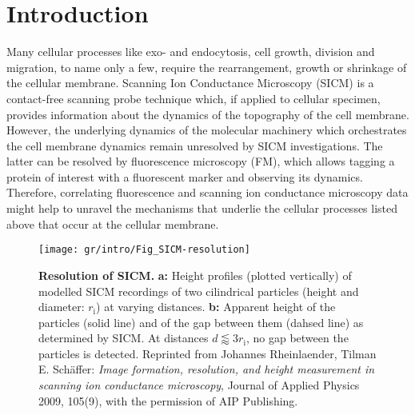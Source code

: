 \section{Introduction}
\label{sec:introduction}
Many cellular processes like exo- and endocytosis, cell growth, division and
migration, to name only a few, require the rearrangement, growth or shrinkage
of the cellular membrane. Scanning Ion Conductance Microscopy (SICM)
\cite{Hansma1989} is a contact-free scanning probe technique which, if applied
to cellular specimen, provides information about the dynamics of the
topography of the cell membrane. However, the underlying dynamics of the
molecular machinery which orchestrates the cell membrane dynamics remain
unresolved by SICM investigations. The latter can be resolved by fluorescence
microscopy (FM), which allows tagging a protein of interest with a fluorescent
marker and observing its dynamics. Therefore, correlating fluorescence and
scanning ion conductance microscopy data might help to unravel the mechanisms
that underlie the cellular processes listed above that occur at the cellular
membrane.

\begin{figure}\centering
  \texttt{[image: gr/intro/Fig\_SICM-resolution]}
  \caption{\textbf{Resolution of SICM.}  \textbf{a:} Height profiles
    (plotted vertically) of modelled SICM recordings of two cilindrical
    particles (height and diameter: $r_\text{i}$) at varying
    distances. \textbf{b:} Apparent height of the particles (solid line) and of
    the gap between them (dahsed line) as determined by SICM. At distances
    $d\lessapprox3r_\text{i}$, no gap between the particles is detected.
    Reprinted from Johannes Rheinlaender, Tilman E. Schäffer: \emph{Image
      formation, resolution, and height measurement in scanning ion
      conductance microscopy}, Journal of Applied Physics 2009, 105(9), with
    the permission of AIP Publishing.  }
  \label{fig:sicm-resolution}
\end{figure}
  
